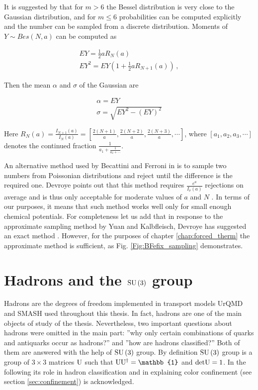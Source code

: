 It is suggested by \cite{Yuan2000} that for $m > 6$ the Bessel distribution is
very close to the Gaussian distribution, and for $m \leq 6$ probabilities can
be computed explicitly and the number can be sampled from a discrete
distribution. Moments of $Y \sim Bes(N,a)$ can be computed as

\begin{eqnarray}
  EY = \frac{1}{2} a R_N(a) \\
  EY^2 = EY \left( 1 + \frac{1}{2} a R_{N+1}(a)\right) \,,
\end{eqnarray}

Then the mean $\alpha$ and $\sigma$ of the Gaussian are

\begin{eqnarray}
  \alpha = EY \\
  \sigma = \sqrt{EY^2 - (EY)^2}
\end{eqnarray}

Here $R_N(a) = \frac{I_{N+1}(a)}{I_N(a)} = [\frac{2(N+1)}{a}, \frac{2(N+2)}{a},
\frac{2(N+3)}{a}, \cdots]$, where $[a_1,a_2,a_3,\cdots]$ denotes the continued
fraction $\frac{1}{a_1 + \frac{1}{a_2 + \cdots}}$.

An alternative method used by Becattini and Ferroni in \cite{Becattini:2004rq}
is to sample two numbers from Poissonian distributions and reject until the
difference is the required one. Devroye points out that this method requires
$\frac{e^a}{I_{\nu}(a)}$ rejections on average and is thus only acceptable for
moderate values of $a$ and $N$ \cite{Devroye2001}. In terms of our purposes, it
means that such method works well only for small enough chemical potentials.
For completeness let us add that in response to the approximate sampling method by
Yuan and Kalbfleisch, Devroye has suggested an exact method \cite{Devroye2001}.
However, for the purposes of chapter \ref{chap:forced_therm} the approximate method is
sufficient, as Fig. \ref{Fig:BFefix_sampling} demonstrates.

\chapter{Hadrons and the $\mathrm{SU}\left({3}\right)$ group} \label{sec:SU3}


Hadrons are the degrees of freedom implemented in transport models UrQMD and
SMASH used throughout this thesis. In fact, hadrons are one of the main objects
of study of the thesis. Nevertheless, two important questions about hadrons
were omitted in the main part: ''why only certain combinations of quarks and
antiquarks occur as hadrons?'' and ''how are hadrons classified?'' Both of them
are answered with the help of $\mathrm{SU}\left({3}\right)$ group. By definition $\mathrm{SU}\left({3}\right)$
group is a group of $3 \times 3$ matrices $\mathrm{U}$ such that $\U\U^{\dag} =
\mathbb{1}$ and $\mathrm{det} \mathrm{U} = 1$. In the following its role in
hadron classification and in explaining color confinement (see section
\ref{sec:confinement}) is acknowledged.

